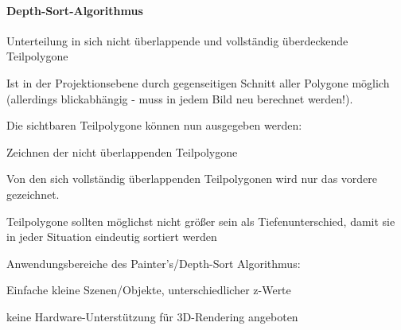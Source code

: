 \documentclass[landscape]{article}
\begin{document}
\begin{multicols}{3}
  \paragraph{Depth-Sort-Algorithmus}
  \begin{itemize*}
    \item Unterteilung in sich nicht überlappende und vollständig überdeckende Teilpolygone
    \item Ist in der Projektionsebene durch gegenseitigen Schnitt aller Polygone möglich (allerdings blickabhängig - muss in jedem Bild neu berechnet werden!).
    \item Die sichtbaren Teilpolygone können nun ausgegeben werden:
    \item Zeichnen der nicht überlappenden Teilpolygone
    \item Von den sich vollständig überlappenden Teilpolygonen wird nur das vordere gezeichnet.
    \item Teilpolygone sollten möglichst nicht größer sein als Tiefenunterschied, damit sie in jeder Situation eindeutig sortiert werden
  \end{itemize*}
  
  Anwendungsbereiche des Painter's/Depth-Sort Algorithmus:
  \begin{itemize*}
    \item Einfache kleine Szenen/Objekte, unterschiedlicher z-Werte
    \item keine Hardware-Unterstützung für 3D-Rendering angeboten
  \end{itemize*}
  

\end{multicols}
\end{document}
